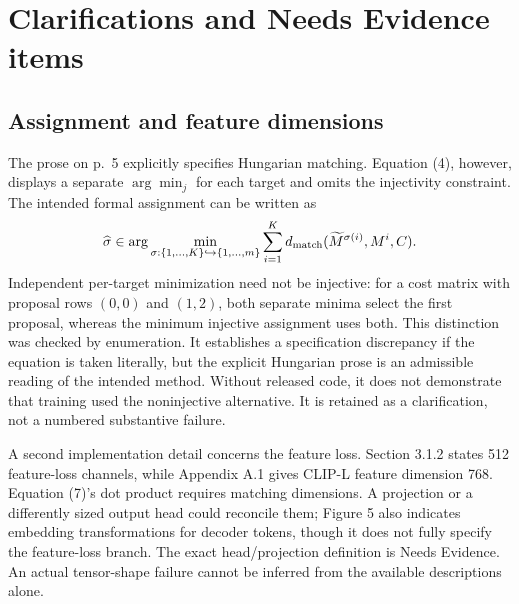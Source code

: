 \documentclass[10pt]{article}
\begin{document}
\section*{Clarifications and Needs Evidence items}
\subsection*{Assignment and feature dimensions}
The prose on p. 5 explicitly specifies Hungarian matching. Equation (4), however, displays a separate \(\arg\min_j\) for each target and omits the injectivity constraint. The intended formal assignment can be written as \[\widehat\sigma\in
\arg\min_{\sigma:\{1,\ldots,K\}\hookrightarrow\{1,\ldots,m\}}
\sum_{i=1}^K d_{\rm match}(\widetilde M^{\sigma(i)},M^i,C).\] Independent per-target minimization need not be injective: for a cost matrix with proposal rows \((0,0)\) and \((1,2)\), both separate minima select the first proposal, whereas the minimum injective assignment uses both. This distinction was checked by enumeration. It establishes a specification discrepancy if the equation is taken literally, but the explicit Hungarian prose is an admissible reading of the intended method. Without released code, it does not demonstrate that training used the noninjective alternative. It is retained as a clarification, not a numbered substantive failure.\par
A second implementation detail concerns the feature loss. Section 3.1.2 states 512 feature-loss channels, while Appendix A.1 gives CLIP-L feature dimension 768. Equation (7)’s dot product requires matching dimensions. A projection or a differently sized output head could reconcile them; Figure 5 also indicates embedding transformations for decoder tokens, though it does not fully specify the feature-loss branch. The exact head/projection definition is Needs Evidence. An actual tensor-shape failure cannot be inferred from the available descriptions alone.\par
\end{document}
